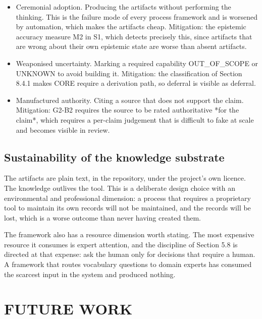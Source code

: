 \documentclass[11pt,a4paper]{article}
\begin{document}
\begin{itemize}[leftmargin=*,nosep,topsep=2pt]
\item Ceremonial adoption. Producing the artifacts without performing the   thinking. This is the failure mode of every process framework and is   worsened by automation, which makes the artifacts cheap. Mitigation: the   epistemic accuracy measure M2 in S1, which detects precisely this, since   artifacts that are wrong about their own epistemic state are worse than   absent artifacts.
\item Weaponised uncertainty. Marking a required capability OUT\_OF\_SCOPE or   UNKNOWN to avoid building it. Mitigation: the classification of Section 8.4.1   makes CORE require a derivation path, so deferral is visible as deferral.
\item Manufactured authority. Citing a source that does not support the claim.   Mitigation: G2-B2 requires the source to be rated authoritative *for the   claim*, which requires a per-claim judgement that is difficult to fake at   scale and becomes visible in review.
\end{itemize}

\subsection{Sustainability of the knowledge substrate}

The artifacts are plain text, in the repository, under the project's own licence. The knowledge outlives the tool. This is a deliberate design choice with an environmental and professional dimension: a process that requires a proprietary tool to maintain its own records will not be maintained, and the records will be lost, which is a worse outcome than never having created them.

The framework also has a resource dimension worth stating. The most expensive resource it consumes is expert attention, and the discipline of Section 5.8 is directed at that expense: ask the human only for decisions that require a human. A framework that routes vocabulary questions to domain experts has consumed the scarcest input in the system and produced nothing.

\section{FUTURE WORK}
\end{document}
